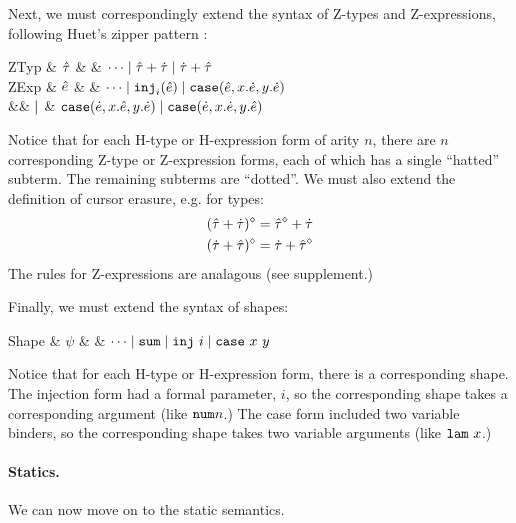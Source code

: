 Next, we must correspondingly extend the syntax of Z-types and Z-expressions, following Huet's zipper pattern \cite{JFP::Huet1997}: 
%

\begin{grammar}
\textsf{ZTyp} & $\hat{\tau}$ & \bnfas & $\cdots \mathrel{\mid} {\hat{\tau}} + {\dot{\tau}} \mathrel{\mid} {\dot{\tau}} + {\hat{\tau}}$
\\
\textsf{ZExp} & $\hat{e}$ & \bnfas & $\cdots
\mathrel{\mid} \texttt{inj}_{i}({\hat{e}})
\mathrel{\mid} \texttt{case}({\hat{e}},{x}.{\dot{e}},{y}.{\dot{e}})$
\\
&& $\mathrel{\mid}$ & $\texttt{case}({\dot{e}},{x}.{\hat{e}},{y}.{\dot{e}})
\mathrel{\mid}\texttt{case}({\dot{e}},{x}.{\dot{e}},{y}.{\hat{e}})$
\end{grammar}
Notice that for each H-type or H-expression form of arity $n$, there are $n$ corresponding Z-type or Z-expression forms, each of which has a single ``hatted'' subterm. The remaining subterms are ``dotted''. We must also extend the definition of cursor erasure, e.g. for types:
\begin{align*}
(\hat{\tau} + \dot{\tau})^{\diamond} & = \hat{\tau}^{\diamond} + \dot{\tau}\\
(\dot{\tau} + \hat{\tau})^{\diamond} & = \dot{\tau} + \hat{\tau}^{\diamond}
\end{align*}
The rules for Z-expressions are analagous (see supplement.)

Finally, we must extend the syntax of shapes:
\begin{grammar}
\textsf{Shape} & $\psi$ & \bnfas & $\cdots \mathrel{\mid} \mathtt{sum} \mathrel{\mid} \mathtt{inj}~i \mathrel{\mid} \mathtt{case}~x~y$
\end{grammar}
Notice that for each H-type or H-expression form, there is a corresponding shape. The injection form had a formal parameter, $i$, so the corresponding shape takes a corresponding argument (like $\mathtt{num}{n}$.) The case form included two variable binders, so the corresponding shape takes two variable arguments (like $\mathtt{lam}~x$.)



\paragraph{Statics.}
We can now move on to the static semantics. 

